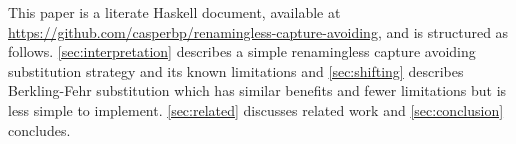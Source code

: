 


This paper is a literate Haskell document, available at \url{https://github.com/casperbp/renamingless-capture-avoiding}, and is structured as follows.
\cref{sec:interpretation} describes a simple renamingless capture avoiding substitution strategy and its known limitations and \cref{sec:shifting} describes Berkling-Fehr substitution which has similar benefits and fewer limitations but is less simple to implement.
\cref{sec:related} discusses related work and \cref{sec:conclusion} concludes.



